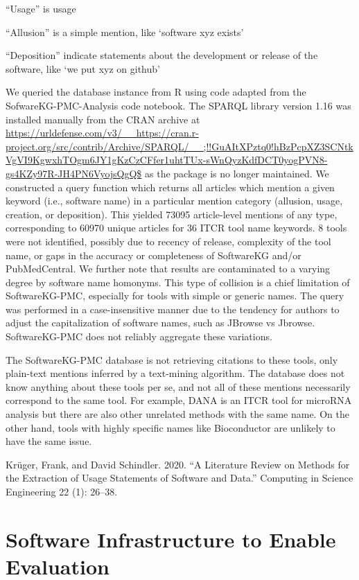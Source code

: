 “Usage” is usage

“Allusion” is a simple mention, like ‘software xyz exists’

“Deposition” indicate statements about the development or release of the software, like ‘we put xyz on github’

We queried the database instance from R using code adapted from the SofwareKG-PMC-Analysis code notebook. The SPARQL library version 1.16 was installed manually from the CRAN archive at \url{https://urldefense.com/v3/__https://cran.r-project.org/src/contrib/Archive/SPARQL/__;!!GuAItXPztq0!hBzPcpXZ3SCNtkVgVI9KgwxhTOgm6JY1gKzCzCFfer1uhtTUx-sWnQyzKdfDCT0yogPVN8-gs4KZy97R-JH4PN6VyojsQgQ$}  as the package is no longer maintained. We constructed a query function which returns all articles which mention a given keyword (i.e., software name) in a particular mention category (allusion, usage, creation, or deposition). This yielded 73095 article-level mentions of any type, corresponding to 60970 unique articles for 36 ITCR tool name keywords. 8 tools were not identified, possibly due to recency of release, complexity of the tool name, or gaps in the accuracy or completeness of SoftwareKG and/or PubMedCentral. We further note that results are contaminated to a varying degree by software name homonyms. This type of collision is a chief limitation of SoftwareKG-PMC, especially for tools with simple or generic names. The query was performed in a case-insensitive manner due to the tendency for authors to adjust the capitalization of software names, such as JBrowse vs Jbrowse. SoftwareKG-PMC does not reliably aggregate these variations.


The SoftwareKG-PMC database is not retrieving citations to these tools, only plain-text mentions inferred by a text-mining algorithm. The database does not know anything about these tools per se, and not all of these mentions necessarily correspond to the same tool. For example, DANA is an ITCR tool for microRNA analysis but there are also other unrelated methods with the same name. On the other hand, tools with highly specific names like Bioconductor are unlikely to have the same issue.

Krüger, Frank, and David Schindler. 2020. “A Literature Review on Methods for the Extraction of Usage Statements of Software and Data.” Computing in Science Engineering 22 (1): 26–38.


\section{Software Infrastructure to Enable Evaluation}


